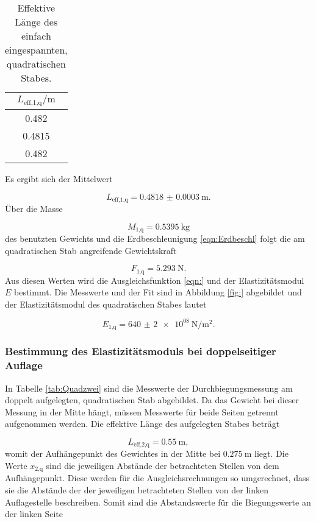 \begin{table}[H]
  \centering
  \caption{Effektive Länge des einfach eingespannten, quadratischen Stabes.}
  \label{tab:Quadeinleff}
  \begin{tabular}{c}
    \toprule
    $L_\text{eff,1,q}/\si{\meter}$ \\
    \midrule
    0.482 \\
    0.4815 \\
    0.482 \\
    \bottomrule
  \end{tabular}
\end{table}

Es ergibt sich der Mittelwert

\begin{equation}
  L_\text{eff,1,q} = \SI{0.4818(3)}{\meter}.
\end{equation}
Über die Masse

\begin{equation}
  M_\text{1,q} =  \SI{0.5395}{\kilo\gram}
\end{equation}
des benutzten Gewichts
und die Erdbeschleunigung \eqref{eqn:Erdbeschl}
folgt die am quadratischen Stab angreifende Gewichtskraft

\begin{equation}
  F_\text{1,q} = \SI{5.293}{\newton}.
\end{equation}
Aus diesen Werten wird die Ausgleichsfunktion \eqref{eqn:} und der
Elastizitätsmodul $E$ bestimmt. Die Messwerte und der Fit sind in Abbildung
\ref{fig:} abgebildet und der Elastizitätsmodul des quadratischen Stabes lautet

\begin{equation}
  E_\text{1,q} = \SI{640(2)e08}{\newton\per\meter\squared}.
\end{equation}

\subsubsection{Bestimmung des Elastizitätsmoduls bei doppelseitiger Auflage}

In Tabelle \ref{tab:Quadzwei} sind die Messwerte der Durchbiegungsmessung am
doppelt aufgelegten, quadratischen Stab abgebildet. Da das Gewicht bei dieser
Messung in der Mitte hängt, müssen Messwerte für beide Seiten getrennt
aufgenommen werden. Die effektive Länge des aufgelegten Stabes beträgt

\begin{equation}
  L_\text{eff,2,q} = \SI{0.55}{\meter},
\end{equation}
womit der Aufhängepunkt des Gewichtes in der Mitte bei $\SI{0.275}{\meter}$
liegt. Die Werte $x_\text{2,q}$ sind die jeweiligen Abstände der
betrachteten Stellen von dem Aufhängepunkt. Diese werden
für die Ausgleichsrechnungen so umgerechnet, dass sie die Abstände der
der jeweiligen betrachteten Stellen von der linken Auflagestelle beschreiben.
Somit sind die Abstandswerte für die Biegungswerte an der linken Seite

